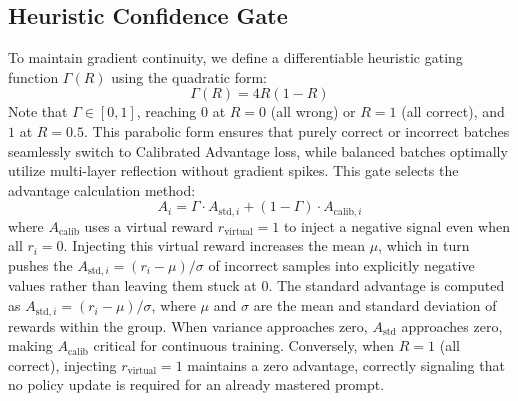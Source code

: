 \subsection{Heuristic Confidence Gate}\label{subsec:heuristic_gate}
To maintain gradient continuity, we define a differentiable heuristic gating function $\Gamma(R)$ using the quadratic form:
\begin{equation}
\Gamma(R) = 4R(1-R)
\end{equation}
Note that $\Gamma \in [0, 1]$, reaching $0$ at $R=0$ (all wrong) or $R=1$ (all correct), and $1$ at $R=0.5$. This parabolic form ensures that purely correct or incorrect batches seamlessly switch to Calibrated Advantage loss, while balanced batches optimally utilize multi-layer reflection without gradient spikes. This gate selects the advantage calculation method:
\begin{equation}
A_i = \Gamma \cdot A_{\text{std}, i} + (1-\Gamma) \cdot A_{\text{calib}, i}
\end{equation}
where $A_{\text{calib}}$ uses a virtual reward $r_{\text{virtual}} = 1$ to inject a negative signal even when all $r_i=0$. Injecting this virtual reward increases the mean $\mu$, which in turn pushes the $A_{\text{std},i}=(r_i-\mu)/\sigma$ of incorrect samples into explicitly negative values rather than leaving them stuck at 0. The standard advantage is computed as $A_{\text{std}, i} = (r_i - \mu) / \sigma$, where $\mu$ and $\sigma$ are the mean and standard deviation of rewards within the group. When variance approaches zero, $A_{\text{std}}$ approaches zero, making $A_{\text{calib}}$ critical for continuous training. Conversely, when $R=1$ (all correct), injecting $r_{\text{virtual}}=1$ maintains a zero advantage, correctly signaling that no policy update is required for an already mastered prompt.

